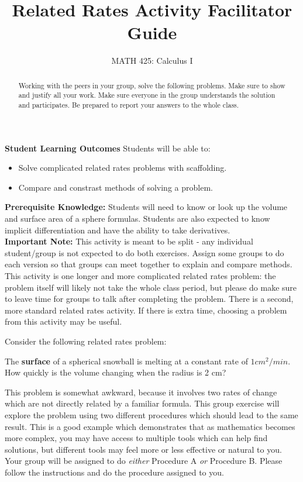 \documentclass{ximera}
\title{Related Rates Activity Facilitator Guide}
\author{MATH 425: Calculus I}
\begin{document}
\begin{abstract}
   Working with the peers in your group, solve the following problems. Make sure to show and justify all your work. Make sure everyone in the group understands the solution and participates. Be prepared to report your answers to the whole class. 
\end{abstract}
\maketitle

\textbf{Student Learning Outcomes}
Students will be able to: 
    \begin{itemize}
        \item Solve complicated related rates problems with scaffolding.
        \item Compare and constrast methods of solving a problem.
    \end{itemize}

\textbf{Prerequisite Knowledge:} Students will need to know or look up the volume and surface area of a sphere formulas.  Students are also expected to know implicit differentiation and have the ability to take derivatives.\\

\textbf{Important Note:} This activity is meant to be split - any individual student/group is not expected to do both exercises.  Assign some groups to do each version so that groups can meet together to explain and compare methods.  This activity is one longer and more complicated related rates problem: the problem itself will likely not take the whole class period, but please do make sure to leave time for groups to talk after completing the problem. There is a second, more standard related rates activity.  If there is extra time, choosing a problem from this activity may be useful. 


Consider the following related rates problem:\\
\begin{example}
    The \textbf{surface} of a spherical snowball is melting at a constant rate of $1cm^2/min$.  How quickly is the volume changing when the radius is 2 cm?\\
\end{example}

This problem is somewhat awkward, because it involves two rates of change which are not directly related by a familiar formula.  This group exercise will explore the problem using two different procedures which should lead to the same result.  This is a good example which demonstrates that as mathematics becomes more complex, you may have access to multiple tools which can help find solutions, but different tools may feel more or less effective or natural to you.\\
Your group will be assigned to do \textit{either} Procedure A \textit{or} Procedure B.  Please follow the instructions and do the procedure assigned to you.
\end{document}
